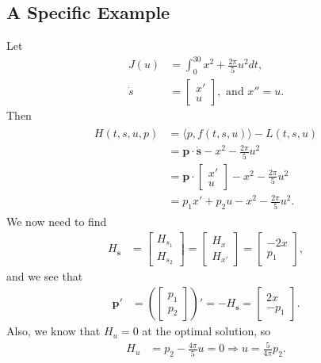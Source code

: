 \subsection*{A Specific Example}
Let
\begin{align*}
	J(u) &= \int_0^{30} x^2 + \frac{2\pi}{5}u^2dt,\\
	\dot{s} &=  \begin{bmatrix}x'\\u \end{bmatrix}, \text{ and } x''=u.
\end{align*}
Then
\begin{align*}
	\begin{split}
	H(t,s,u,p) &= \langle p,f(t,s,u)\rangle - L(t,s,u)\\
	&= \boldsymbol{p} \cdot \dot{\boldsymbol{s}} - x^2 - \frac{2\pi}{5}u^2\\
	&= \boldsymbol{p} \cdot \begin{bmatrix}x'\\u \end{bmatrix} - x^2 - \frac{2\pi}{5}u^2\\
	&= p_1x' + p_2u - x^2 - \frac{2\pi}{5}u^2.
	\end{split}
\end{align*}
We now need to find
\begin{align*}
	H_{\boldsymbol{s}} &= \begin{bmatrix}H_{s_1}\\H_{s_2}\end{bmatrix} = \begin{bmatrix}H_{x}\\H_{x'}\end{bmatrix} = \begin{bmatrix}-2x\\p_1\end{bmatrix},
\end{align*}
and we see that
\begin{align*}
	\boldsymbol{p}' &= \left( \begin{bmatrix}p_1\\p_2\end{bmatrix} \right)'= -H_{\boldsymbol{s}} = \begin{bmatrix}2x\\-p_1\end{bmatrix}.
\end{align*}
Also, we know that $H_u=0$ at the optimal solution, so
\begin{align*}
	H_u &= p_2 - \frac{4\pi}{5}u=0 \Rightarrow u=\frac{5}{4\pi}p_2.
\end{align*}
